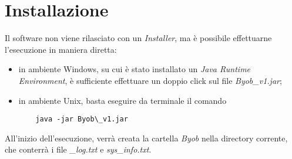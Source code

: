 \chapter{Installazione}

Il software non viene rilasciato con un \textit{Installer}, ma \`{e} possibile effettuarne l'esecuzione in maniera diretta:
\begin{itemize}
	\item in ambiente Windows, su cui \`{e} stato installato un \textit{Java Runtime Environment}, \`{e} sufficiente effettuare un doppio click sul file \textit{Byob\_v1.jar};
	
	\item in ambiente Unix, basta eseguire da terminale il comando
	\begin{lstlisting}
	java -jar Byob\_v1.jar
	\end{lstlisting}
\end{itemize}

All'inizio dell'esecuzione, verr\`{a} creata la cartella \textit{Byob} nella directory corrente, che conterr\`{a} i file \textit{\_log.txt} e \textit{sys\_info.txt}.
